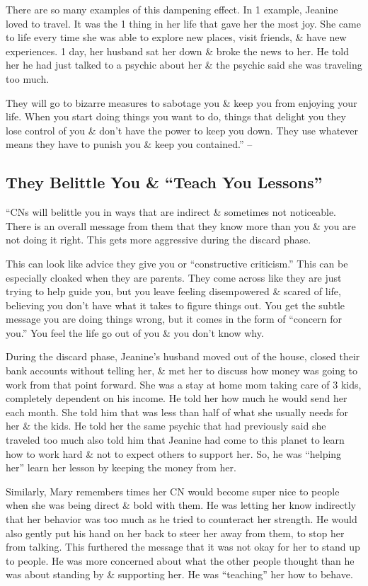 \documentclass{article}
\numberwithin{equation}{section}
\begin{document}
There are so many examples of this dampening effect. In 1 example, Jeanine loved to travel. It was the 1 thing in her life that gave her the most joy. She came to life every time she was able to explore new places, visit friends, \& have new experiences. 1 day, her husband sat her down \& broke the news to her. He told her he had just talked to a psychic about her \& the psychic said she was traveling too much.

They will go to bizarre measures to sabotage you \& keep you from enjoying your life. When you start doing things you want to do, things that delight you they lose control of you \& don't have the power to keep you down. They use whatever means they have to punish you \& keep you contained.'' -- \cite[pp. 63--64]{Mirza2017}

\subsection{They Belittle You \& ``Teach You Lessons''}
``CNs will belittle you in ways that are indirect \& sometimes not noticeable. There is an overall message from them that they know more than you \& you are not doing it right. This gets more aggressive during the discard phase.

This can look like advice they give you or ``constructive criticism.'' This can be especially cloaked when they are parents. They come across like they are just trying to help guide you, but you leave feeling disempowered \& scared of life, believing you don't have what it takes to figure things out. You get the subtle message you are doing things wrong, but it comes in the form of ``concern for you.'' You feel the life go out of you \& you don't know why.

During the discard phase, Jeanine's husband moved out of the house, closed their bank accounts without telling her, \& met her to discuss how money was going to work from that point forward. She was a stay at home mom taking care of 3 kids, completely dependent on his income. He told her how much he would send her each month. She told him that was less than half of what she usually needs for her \& the kids. He told her the same psychic that had previously said she traveled too much also told him that Jeanine had come to this planet to learn how to work hard \& not to expect others to support her. So, he was ``helping her'' learn her lesson by keeping the money from her.

Similarly, Mary remembers times her CN would become super nice to people when she was being direct \& bold with them. He was letting her know indirectly that her behavior was too much as he tried to counteract her strength. He would also gently put his hand on her back to steer her away from them, to stop her from talking. This furthered the message that it was not okay for her to stand up to people. He was more concerned about what the other people thought than he was about standing by \& supporting her. He was ``teaching'' her how to behave.
\end{document}

